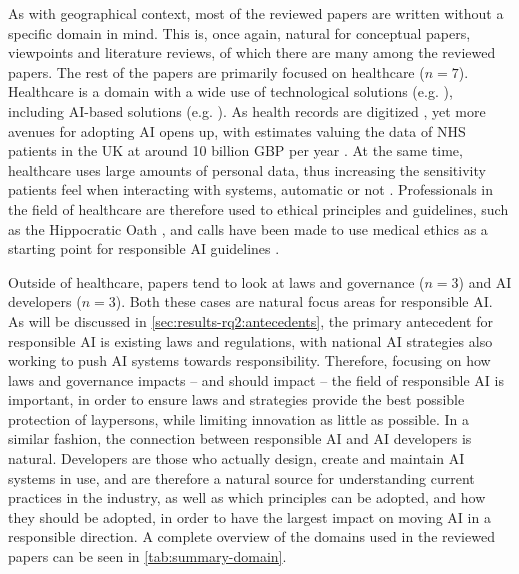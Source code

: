 As with geographical context, most of the reviewed papers are written without a specific domain in mind. This is, once again, natural for conceptual papers, viewpoints and literature reviews, of which there are many among the reviewed papers. The rest of the papers are primarily focused on healthcare ($n = 7$). Healthcare is a domain with a wide use of technological solutions (e.g. \cite{Azaria_2016,Martinez_2008,Son_2014}), including AI-based solutions (e.g. \cite{Singh_2023,Kumar_2023}). As health records are digitized \parencite{Rajkomar_2018}, yet more avenues for adopting AI opens up, with estimates valuing the data of NHS patients in the UK at around 10 billion GBP per year \parencite{Downey_2019}. At the same time, healthcare uses large amounts of personal data, thus increasing the sensitivity patients feel when interacting with systems, automatic or not \parencite{Gupta_2021}. Professionals in the field of healthcare are therefore used to ethical principles and guidelines, such as the Hippocratic Oath \parencite{Wiesing_2020}, and calls have been made to use medical ethics as a starting point for responsible AI guidelines \parencite{DaltonBrown_2020, Siala_2022}.

Outside of healthcare, papers tend to look at laws and governance ($n = 3$) and AI developers ($n = 3$). Both these cases are natural focus areas for responsible AI. As will be discussed in \autoref{sec:results-rq2:antecedents}, the primary antecedent for responsible AI is existing laws and regulations, with national AI strategies also working to push AI systems towards responsibility. Therefore, focusing on how laws and governance impacts -- and should impact -- the field of responsible AI is important, in order to ensure laws and strategies provide the best possible protection of laypersons, while limiting innovation as little as possible. In a similar fashion, the connection between responsible AI and AI developers is natural. Developers are those who actually design, create and maintain AI systems in use, and are therefore a natural source for understanding current practices in the industry, as well as which principles can be adopted, and how they should be adopted, in order to have the largest impact on moving AI in a responsible direction. A complete overview of the domains used in the reviewed papers can be seen in \autoref{tab:summary-domain}.

